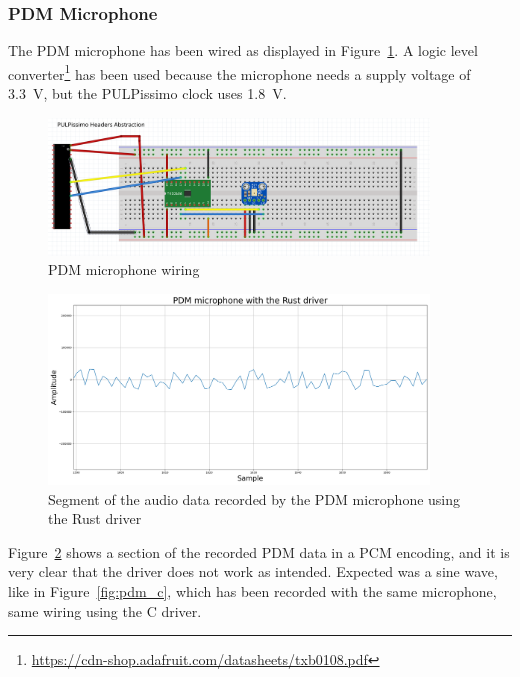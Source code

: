 \subsubsection{PDM Microphone}

The PDM microphone has been wired as displayed in Figure~\ref{fig:pdm_wiring}.
A logic level converter\footnote{\url{https://cdn-shop.adafruit.com/datasheets/txb0108.pdf}}
has been used because the microphone needs a supply voltage of \SI{3.3}{\volt}, but the
PULPissimo clock uses \SI{1.8}{\volt}.

\begin{figure}[H]
    \centering
    \includegraphics[width=0.9\textwidth]{figures/pdm/wiring.png}
    \caption[PDM microphone wiring with an abstraction for the PULPissimo]{PDM microphone wiring}
    \label{fig:pdm_wiring}
\end{figure}


\begin{figure}[H]
    \centering
    \includegraphics[width=0.9\textwidth]{figures/pdm/pdm_rust.png}
    \caption[Segment of the audio data recorded by the PDM microphone using the Rust driver]{Segment of the audio data recorded by the PDM microphone using the Rust driver}
    \label{fig:pdm_rust}
\end{figure}

Figure~\ref{fig:pdm_rust} shows a section of the recorded PDM data in a PCM encoding, and it is very clear that the driver does not work as intended.
Expected was a sine wave, like in Figure~\ref{fig:pdm_c}, which has been recorded with the same microphone, same wiring using the C driver.

